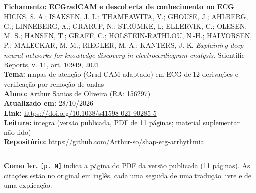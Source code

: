 \documentclass[11pt,a4paper]{article}
\begin{document}
\sloppy

\begin{center}
    {\LARGE \textbf{Fichamento: ECGradCAM e descoberta de conhecimento no ECG}} \\[0.35em]
    {\large HICKS, S. A.; ISAKSEN, J. L.; THAMBAWITA, V.; GHOUSE, J.; AHLBERG, G.; LINNEBERG, A.; GRARUP, N.; STRÜMKE, I.; ELLERVIK, C.; OLESEN, M. S.; HANSEN, T.; GRAFF, C.; HOLSTEIN-RATHLOU, N.-H.; HALVORSEN, P.; MALECKAR, M. M.; RIEGLER, M. A.; KANTERS, J. K. \textit{Explaining deep neural networks for knowledge discovery in electrocardiogram analysis}. Scientific Reports, v. 11, art. 10949, 2021} \\[0.3em]
    \textbf{Tema:} mapas de atenção (Grad-CAM adaptado) em ECG de 12 derivações e verificação por remoção de ondas \\[0.2em]
    \textbf{Aluno:} Arthur Santos de Oliveira (RA: 156297) \\[0.2em]
    \textbf{Atualizado em:} 28/10/2026 \\[0.2em]
    \textbf{Link:} \url{https://doi.org/10.1038/s41598-021-90285-5} \\[0.2em]
    \textbf{Leitura:} íntegra (versão publicada, PDF de 11 páginas; material suplementar não lido) \\[0.2em]
    \textbf{Repositório:} \url{https://github.com/Arthur-so/shap-ecg-arrhythmia}
\end{center}
\vspace{-0.5em}
\hrule
\vspace{0.8em}

\textbf{Como ler.} \texttt{[p. N]} indica a página do PDF da versão publicada (11 páginas). As citações estão no original em inglês, cada uma seguida de uma tradução livre e de uma explicação.
\end{document}
